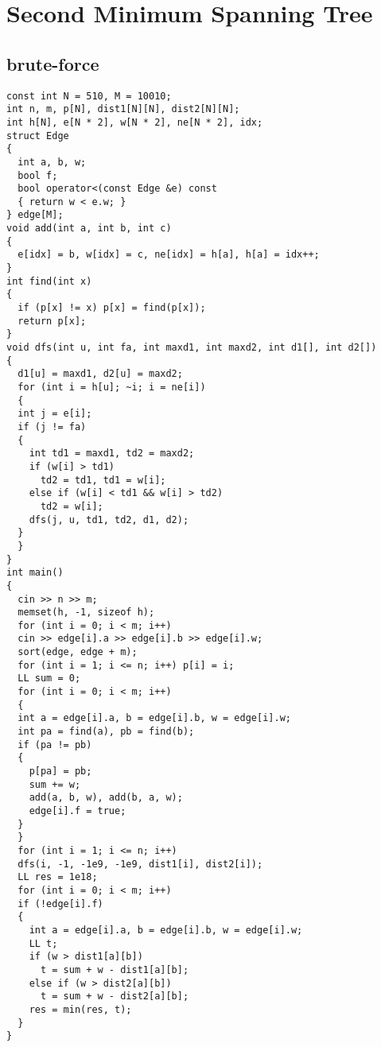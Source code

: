 \section{Second Minimum Spanning Tree}
\subsection{brute-force}
\begin{lstlisting}
const int N = 510, M = 10010;
int n, m, p[N], dist1[N][N], dist2[N][N];
int h[N], e[N * 2], w[N * 2], ne[N * 2], idx;
struct Edge
{
  int a, b, w;
  bool f;
  bool operator<(const Edge &e) const
  { return w < e.w; }
} edge[M];
void add(int a, int b, int c)
{
  e[idx] = b, w[idx] = c, ne[idx] = h[a], h[a] = idx++;
}
int find(int x)
{
  if (p[x] != x) p[x] = find(p[x]);
  return p[x];
}
void dfs(int u, int fa, int maxd1, int maxd2, int d1[], int d2[])
{
  d1[u] = maxd1, d2[u] = maxd2;
  for (int i = h[u]; ~i; i = ne[i])
  {
  int j = e[i];
  if (j != fa)
  {
    int td1 = maxd1, td2 = maxd2;
    if (w[i] > td1)
      td2 = td1, td1 = w[i];
    else if (w[i] < td1 && w[i] > td2)
      td2 = w[i];
    dfs(j, u, td1, td2, d1, d2);
  }
  }
}
int main()
{
  cin >> n >> m;
  memset(h, -1, sizeof h);
  for (int i = 0; i < m; i++)
  cin >> edge[i].a >> edge[i].b >> edge[i].w;
  sort(edge, edge + m);
  for (int i = 1; i <= n; i++) p[i] = i;
  LL sum = 0;
  for (int i = 0; i < m; i++)
  {
  int a = edge[i].a, b = edge[i].b, w = edge[i].w;
  int pa = find(a), pb = find(b);
  if (pa != pb)
  {
    p[pa] = pb;
    sum += w;
    add(a, b, w), add(b, a, w);
    edge[i].f = true;
  }
  }
  for (int i = 1; i <= n; i++)
  dfs(i, -1, -1e9, -1e9, dist1[i], dist2[i]);
  LL res = 1e18;
  for (int i = 0; i < m; i++)
  if (!edge[i].f)
  {
    int a = edge[i].a, b = edge[i].b, w = edge[i].w;
    LL t;
    if (w > dist1[a][b])
      t = sum + w - dist1[a][b];
    else if (w > dist2[a][b])
      t = sum + w - dist2[a][b];
    res = min(res, t);
  }
}
\end{lstlisting}
